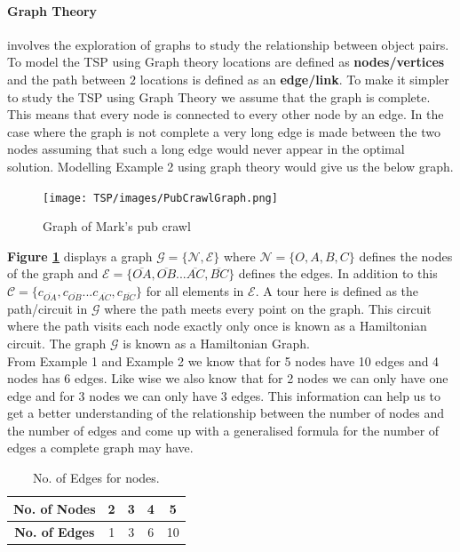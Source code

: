 \documentclass[a4paper]{article}
\begin{document}
\paragraph{Graph Theory} involves the exploration of graphs to study the relationship between object pairs.\citep{4} To model the TSP using Graph theory locations are defined as \textbf{nodes/vertices} and the path between $2$ locations is defined as an \textbf{edge/link}. To make it simpler to study the TSP using Graph Theory we assume that the graph is complete. This means that every node is connected to every other node by an edge. In the case where the graph is not complete a very long edge is made between the two nodes assuming that such a long edge would never appear in the optimal solution. Modelling Example 2 using graph theory would give us the below graph.
\begin{figure}[H]
    \centering
        \texttt{[image: TSP/images/PubCrawlGraph.png]}
        \caption{Graph of Mark's pub crawl}
        \label{fig:markGraph}
\end{figure}
\textbf{Figure \ref{fig:markGraph}} displays a graph $\mathcal{G} = \{\mathcal{N},\mathcal{E}\}$ where $\mathcal{N} = \{O, A, B ,C \}$ defines the nodes of the graph and $\mathcal{E} = \{\overline{OA},\overline{OB}...\overline{AC},\overline{BC}\}$ defines the edges. In addition to this $\mathcal{C}=\{c_{\overline{OA}},c_{\overline{OB}}...c_{\overline{AC}}, c_{\overline{BC}} \}$ for all elements in $\mathcal{E}$. A tour here is defined as the path/circuit in $\mathcal{G}$ where the path meets every point on the graph. This circuit where the path visits each node exactly only once is known as a Hamiltonian circuit. The graph $\mathcal{G}$ is known as a Hamiltonian Graph.\\
From Example 1 and Example 2 we know that for 5 nodes have 10 edges and 4 nodes has 6 edges. Like wise we also know that for 2 nodes we can only have one edge and for 3 nodes we can only have 3 edges. This information can help us to get a better understanding of the relationship between the number of nodes and the number of edges and come up with a generalised formula for the number of edges a complete graph may have.
\begin{table}[H]
    \centering
    \begin{tabular}{|c|c|c|c|c|}
    \hline
    \textbf{No. of Nodes}     & \textbf{2} & \textbf{3} & \textbf{4} & \textbf{5}          \\ 
    \hline
    \textbf{No. of Edges}     & 1 & 3 & 6 & 10           \\
    \hline
    \end{tabular}
    \caption{No. of Edges for nodes.}
    \label{tab:NoOfEdges}
\end{table}
\end{document}
